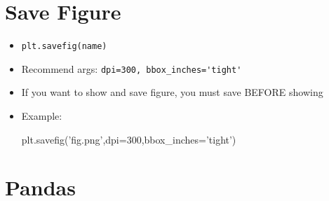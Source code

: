 \documentclass[12pt]{article}
\numberwithin{equation}{section}
\begin{document}
\section{Save Figure}
\begin{itemize}
    \item \verb|plt.savefig(name)|
    \item Recommend args: \verb|dpi=300, bbox_inches='tight'|
    \item If you want to show and save figure, you must save BEFORE showing
    \item Example:  
    \begin{python}
    plt.savefig('fig.png',dpi=300,bbox_inches='tight')
    \end{python}
\end{itemize}

\section{Pandas}
\end{document}
